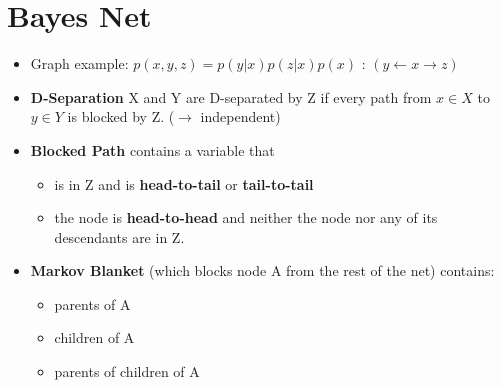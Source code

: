 
\section{Bayes Net}
\begin{itemize}
	\item Graph example: $p(x, y, z) = p(y | x) p(z | x) p(x)$ : $(y \leftarrow x \rightarrow z)$ 
	\item \textbf{D-Separation} X and Y are D-separated by Z if every path from $ x \in X$ to $y \in Y$ is blocked by Z. ($\rightarrow$ independent)
	\item \textbf{Blocked Path} contains a variable that
	\begin{itemize}
		\item is in Z and is \textbf{head-to-tail} or \textbf{tail-to-tail}
		\item the node is \textbf{head-to-head} and neither the node nor any of its descendants are in Z.
	\end{itemize}	
	\item \textbf{Markov Blanket} (which blocks node A from the rest of the net) contains:
	\begin{itemize}
		\item parents of A
		\item children of A
		\item parents of children of A
	\end{itemize}
	
\end{itemize}







